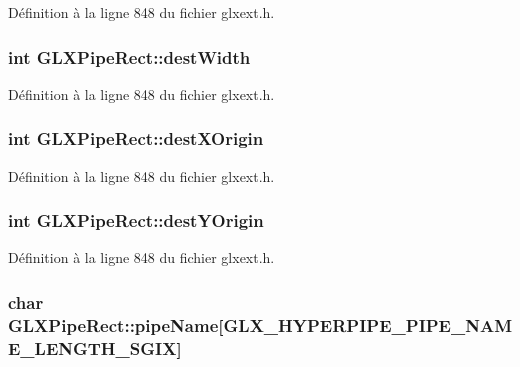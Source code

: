 Définition à la ligne 848 du fichier glxext.\-h.

\hypertarget{struct_g_l_x_pipe_rect_a3c07991d2a8fb6e973eae834650b3dad}{
\subsubsection[{dest\-Width}]{\setlength{\rightskip}{0pt plus 5cm}int G\-L\-X\-Pipe\-Rect\-::dest\-Width}}\label{struct_g_l_x_pipe_rect_a3c07991d2a8fb6e973eae834650b3dad}


Définition à la ligne 848 du fichier glxext.\-h.

\hypertarget{struct_g_l_x_pipe_rect_a8b7b941894ad3420326d7e9fa885bb71}{
\subsubsection[{dest\-X\-Origin}]{\setlength{\rightskip}{0pt plus 5cm}int G\-L\-X\-Pipe\-Rect\-::dest\-X\-Origin}}\label{struct_g_l_x_pipe_rect_a8b7b941894ad3420326d7e9fa885bb71}


Définition à la ligne 848 du fichier glxext.\-h.

\hypertarget{struct_g_l_x_pipe_rect_aef7766b02ef07c20a11e89da5878b469}{
\subsubsection[{dest\-Y\-Origin}]{\setlength{\rightskip}{0pt plus 5cm}int G\-L\-X\-Pipe\-Rect\-::dest\-Y\-Origin}}\label{struct_g_l_x_pipe_rect_aef7766b02ef07c20a11e89da5878b469}


Définition à la ligne 848 du fichier glxext.\-h.

\hypertarget{struct_g_l_x_pipe_rect_aa4c4f60e9647705ddefa10f95a37cb79}{
\subsubsection[{pipe\-Name}]{\setlength{\rightskip}{0pt plus 5cm}char G\-L\-X\-Pipe\-Rect\-::pipe\-Name\mbox{[}{\bf G\-L\-X\-\_\-\-H\-Y\-P\-E\-R\-P\-I\-P\-E\-\_\-\-P\-I\-P\-E\-\_\-\-N\-A\-M\-E\-\_\-\-L\-E\-N\-G\-T\-H\-\_\-\-S\-G\-I\-X}\mbox{]}}}\label{struct_g_l_x_pipe_rect_aa4c4f60e9647705ddefa10f95a37cb79}


